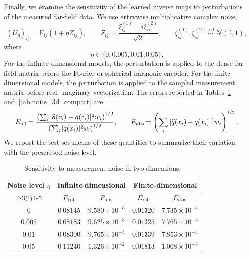 \documentclass{article}
\numberwithin{equation}{section}
\theoremstyle{plain}
\begin{document}
Finally, we examine the sensitivity of the learned inverse maps to
perturbations of the measured far-field data.  We use entrywise multiplicative complex noise,
\begin{equation}\label{eq:num_noise_model}
	(U_\eta)_{ij}
	=
	U_{ij}(1+\eta Z_{ij}),
	\qquad
	Z_{ij}
	=
	\frac{\xi_{ij}^{(1)}+i\xi_{ij}^{(2)}}{\sqrt{2}},
	\qquad
	\xi_{ij}^{(1)},\xi_{ij}^{(2)}
	\stackrel{\mathrm{i.i.d.}}{\sim}\mathcal N(0,1),
\end{equation}
where
\begin{equation*}
	\eta\in\{0,0.005,0.01,0.05\}.
\end{equation*}
For the infinite-dimensional models, the perturbation is applied to the dense far-field matrix before the Fourier or spherical-harmonic encoder.  For the finite-dimensional models, the perturbation is applied to the sampled measurement matrix before real--imaginary vectorization.  The errors reported in Tables~\ref{tab:noise_2d_compact} and~\ref{tab:noise_3d_compact} are
\begin{equation*}
	E_{\rm rel}
	=
	\frac{\left(\sum_i |\widehat q(x_i)-q(x_i)|^2w_i\right)^{1/2}}
	{\left(\sum_i |q(x_i)|^2w_i\right)^{1/2}},
	\qquad
	E_{\rm abs}
	=
	\left(\sum_i |\widehat q(x_i)-q(x_i)|^2w_i\right)^{1/2}.
\end{equation*}
We report the test-set means of these quantities to summarize their variation with the prescribed noise level.

\begin{table}[htbp]
\centering
\caption{Sensitivity to measurement noise in two dimensions.}
\label{tab:noise_2d_compact}
\begin{tabular}{@{}ccccc@{}}
\toprule
Noise level $\eta$
& \multicolumn{2}{c}{Infinite-dimensional}
& \multicolumn{2}{c}{Finite-dimensional} \\
\cmidrule(lr){2-3}\cmidrule(l){4-5}
& $E_{\rm rel}$ & $E_{\rm abs}$ & $E_{\rm rel}$ & $E_{\rm abs}$ \\
\midrule
$0$     & $0.08145$ & $9.580\!\times\!10^{-3}$ & $0.01320$ & $7.735\!\times\!10^{-4}$ \\
$0.005$ & $0.08183$ & $9.625\!\times\!10^{-3}$ & $0.01325$ & $7.765\!\times\!10^{-4}$ \\
$0.01$  & $0.08300$ & $9.765\!\times\!10^{-3}$ & $0.01339$ & $7.853\!\times\!10^{-4}$ \\
$0.05$  & $0.11240$ & $1.326\!\times\!10^{-2}$ & $0.01813$ & $1.068\!\times\!10^{-3}$ \\
\bottomrule
\end{tabular}
\end{table}
\end{document}
